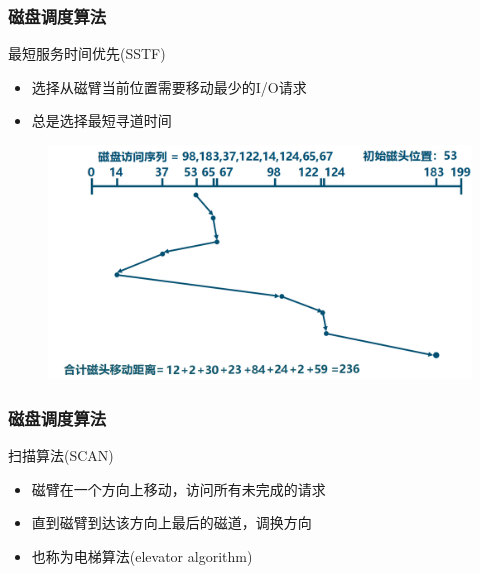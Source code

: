 \begin{frame}[fragile]
    \frametitle{磁盘调度算法}
    最短服务时间优先(SSTF)
    \begin{itemize}
        \item 选择从磁臂当前位置需要移动最少的I/O请求
        \item 总是选择最短寻道时间
    \end{itemize}
    \begin{figure}
    \includegraphics[width=0.65\linewidth]{figs/disk-sstf.png}
    \end{figure}
\end{frame}

\begin{frame}[fragile]
    \frametitle{磁盘调度算法}
    扫描算法(SCAN)
    \begin{itemize}
        \item 磁臂在一个方向上移动，访问所有未完成的请求
        \item 直到磁臂到达该方向上最后的磁道，调换方向
        \item 也称为电梯算法(elevator algorithm)

    \end{itemize}
\end{frame}

